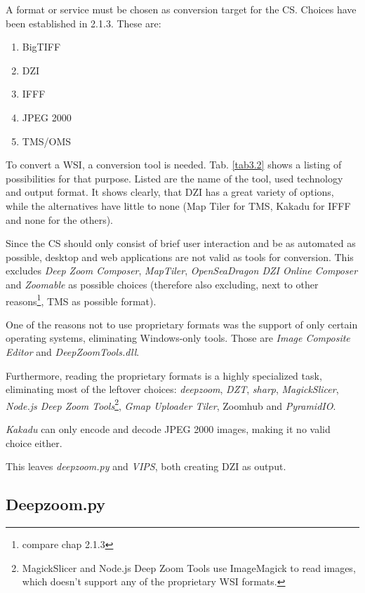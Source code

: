 A format or service must be chosen as conversion target for the CS. Choices have been established in 2.1.3. These are:
\begin{enumerate}[(1)]
	\item BigTIFF
	\item DZI
	\item IFFF
	\item JPEG 2000
	\item TMS/OMS
\end{enumerate}

To convert a WSI, a conversion tool is needed. Tab. \ref{tab3.2} shows a listing of possibilities for that purpose. Listed are the name of the tool, used technology and output format. It shows clearly, that DZI has a great variety of options, while the alternatives have little to none (Map Tiler for TMS, Kakadu for IFFF and none for the others).

Since the CS should only consist of brief user interaction and be as automated as possible, desktop and web applications are not valid as tools for conversion. This excludes \emph{Deep Zoom Composer}, \emph{MapTiler}, \emph{OpenSeaDragon DZI Online Composer} and \emph{Zoomable} as possible choices (therefore also excluding, next to other reasons\footnote{compare chap 2.1.3}, TMS as possible format).

One of the reasons not to use proprietary formats was the support of only certain operating systems, eliminating Windows-only tools. Those are \emph{Image Composite Editor} and \emph{DeepZoomTools.dll}.

Furthermore, reading the proprietary formats is a highly specialized task, eliminating most of the leftover choices: \emph{deepzoom}\cite{web:deepzoom}, \emph{DZT}\cite{web:dzt}, \emph{sharp}\cite{web:sharp}, \emph{MagickSlicer}, \emph{Node.js Deep Zoom Tools}\footnote{MagickSlicer and Node.js Deep Zoom Tools use ImageMagick to read images, which doesn't support any of the proprietary WSI formats\cite{web:imagemagick}.}, \emph{Gmap Uploader Tiler}\cite{web:gmap}, Zoomhub\cite{web:zoomhub} and \emph{PyramidIO}\cite{web:pyramidio}.

\emph{Kakadu} can only encode and decode JPEG 2000 images\cite{web:openseadragon}, making it no valid choice either.

This leaves \emph{deepzoom.py} and \emph{VIPS}, both creating DZI as output.


\subsection{Deepzoom.py}

